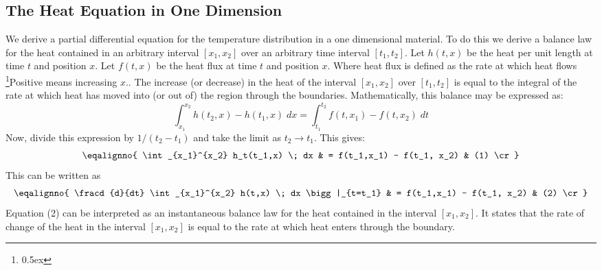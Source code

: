 \subsection{The Heat Equation in One Dimension}
We derive a partial differential equation for the temperature distribution 
in a one dimensional material. To do this we 
derive a balance law for the heat contained in an arbitrary interval 
$[x_1,x_2]$ over an arbitrary time interval $[t_1, t_2]$. 
Let $h(t,x)$ be the 
heat per unit length at time $t$ and position $x$. Let 
$f(t,x)$ be the heat flux at time $t$ and position $x$. Where heat 
flux is defined as the rate at which heat flows
\footnote{\kern -2pt \raise 0.5ex \hbox{\dag}}{Positive means 
increasing $x$.}. The increase (or decrease) in 
the heat of 
the interval $[x_1, x_2]$ over $[t_1, t_2]$ is equal to the integral of
the rate at 
which heat has moved into (or out of) the region through the boundaries.
Mathematically, this balance may be expressed as:
$$
\int_{x_1}^{x_2} h(t_2,x) - h(t_1,x) \; dx  = 
\int_{t_1}^{t_2} f(t, x_1) - f(t,x_2) \; dt
$$
Now, divide this expression by $1 / (t_2 - t_1)$ and take the 
limit as $t_2 \rightarrow t_1$. This gives:
$$
\eqalignno{
\int_{x_1}^{x_2} h_t(t_1,x) \; dx & = f(t_1,x_1) - f(t_1, x_2) & (1) \cr}
$$
This can be written as
$$
\eqalignno{
\fracd{d}{dt} \int_{x_1}^{x_2} h(t,x) \; dx \bigg|_{t=t_1} & 
= f(t_1,x_1) - f(t_1, x_2) 
& (2) \cr}
$$
Equation (2) can be interpreted as an instantaneous balance law for the 
heat contained in the interval $[x_1, x_2]$. It states that the rate of 
change of the heat in the interval $[x_1, x_2]$ is equal to the rate 
at which heat enters through the boundary.



